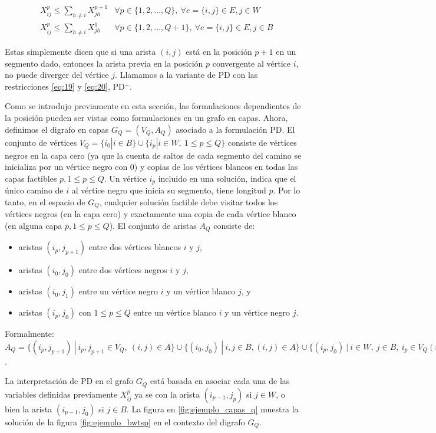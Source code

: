 \documentclass[10pt, a4paper]{article}
\theoremstyle{definition}
\begin{document}
\begin{align}
	& X_{i j}^{p} \leq \sum_{h \neq i} X_{j h}^{p+1} & \forall p \in\{1,2, \ldots, Q\},\ \forall e=\{i, j\} \in E, j \in W \label{eq:19} \\
	& X_{i j}^{p} \leq \sum_{h \neq i} X_{j h}^{1} & \forall p \in\{1,2, \ldots, Q+1\},\ \forall e=\{i, j\} \in E, j \in B \label{eq:20}
\end{align}

Estas simplemente dicen que si una arista $(i,j)$ está en la posición $p+1$ en un segmento dado, entonces la arista previa en la posición $p$ convergente al vértice $i$, no puede diverger del vértice $j$.
Llamamos a la variante de PD con las restricciones \ref{eq:19} y \ref{eq:20},  PD$^+$.

Como se introdujo previamente en esta sección, las formulaciones dependientes de la posición pueden ser vistas como formulaciones en un grafo en capas. Ahora, definimos el digrafo en capas $G_Q = (V_Q,A_Q)$ asociado a la formulación PD.
El conjunto de vértices $V_Q = \{i_0 | i \in B\} \cup \{i_p | i \in W,\ 1 \leq p \leq Q\}$ consiste de vértices negros en la capa cero (ya que la cuenta de saltos de cada segmento del camino se inicializa por un vértice negro con 0) y copias de los vértices blancos en todas las capas factibles $p, 1 \leq p \leq Q$. Un vértice $i_p$ incluido en una solución, indica que el único camino de $i$ al vértice negro que inicia su segmento, tiene longitud $p$.
Por lo tanto, en el espacio de $G_Q$, cualquier solución factible debe visitar todos los vértices negros (en la capa cero) y exactamente una copia de cada vértice blanco (en alguna capa $p, 1 \leq p \leq Q$).
El conjunto de aristas $A_Q$ consiste de:
\begin{itemize}
  \item aristas $(i_p,j_{p+1})$ entre dos vértices blancos $i$ y $j$,
  \item aristas $(i_0,j_0)$ entre dos vértices negros $i$ y $j$,
  \item aristas $(i_0,j_1)$ entre un vértice negro $i$ y un vértice blanco $j$, y
  \item aristas $(i_p,j_0)$ con $1 \leq p \leq Q$ entre un vértice blanco $i$ y un vértice negro $j$.
\end{itemize}

Formalmente: $A_Q = \{(i_p,j_{p+1})\ |\ i_p,j_{p+1} \in V_Q,\ (i,j) \in A\} \cup \{(i_0,j_0)\ |\ i,j \in B, (i,j) \in A\} \cup \{(i_p,j_0)\ |\ i \in W,\ j \in B,\ i_p \in V_Q (i,j) \in A\}$.

La interpretación de PD en el grafo $G_Q$ está basada en asociar cada una de las variables definidas previamente $X_{ij}^p$ ya se con la arista $(i_{p-1},j_p)$ si $j \in W$, o bien la arista $(i_{p-1},j_0)$ si $j \in B$.
La figura en \ref{fig:ejemplo_capas_q} muestra la solución de la figura \ref{fig:ejemplo_bwtsp} en el contexto del digrafo $G_Q$.
\end{document}
